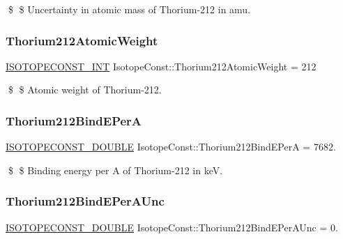 \$ \$ Uncertainty in atomic mass of Thorium-\/212 in amu. \mbox{\label{group___isotope_const-_thorium-_th212_ga4400205486e2155a2347622d73fec85c}} 
\subsubsection{\texorpdfstring{Thorium212\+Atomic\+Weight}{Thorium212AtomicWeight}}
{\footnotesize\ttfamily \mbox{\hyperlink{group___isotope_const-_macros_ga5f18360b3e99483a35c32d789e62621c}{I\+S\+O\+T\+O\+P\+E\+C\+O\+N\+S\+T\+\_\+\+I\+NT}} Isotope\+Const\+::\+Thorium212\+Atomic\+Weight = 212}

\$ \$ Atomic weight of Thorium-\/212. \mbox{\label{group___isotope_const-_thorium-_th212_ga8afe8f6debab2036f5f2570352726593}} 
\subsubsection{\texorpdfstring{Thorium212\+Bind\+E\+PerA}{Thorium212BindEPerA}}
{\footnotesize\ttfamily \mbox{\hyperlink{group___isotope_const-_macros_ga8f45a7272ce02c0b4c65c44636ed719a}{I\+S\+O\+T\+O\+P\+E\+C\+O\+N\+S\+T\+\_\+\+D\+O\+U\+B\+LE}} Isotope\+Const\+::\+Thorium212\+Bind\+E\+PerA = 7682.}

\$ \$ Binding energy per A of Thorium-\/212 in keV. \mbox{\label{group___isotope_const-_thorium-_th212_ga0e5686dbd54b544ade4dfedc295fabe8}} 
\subsubsection{\texorpdfstring{Thorium212\+Bind\+E\+Per\+A\+Unc}{Thorium212BindEPerAUnc}}
{\footnotesize\ttfamily \mbox{\hyperlink{group___isotope_const-_macros_ga8f45a7272ce02c0b4c65c44636ed719a}{I\+S\+O\+T\+O\+P\+E\+C\+O\+N\+S\+T\+\_\+\+D\+O\+U\+B\+LE}} Isotope\+Const\+::\+Thorium212\+Bind\+E\+Per\+A\+Unc = 0.}

